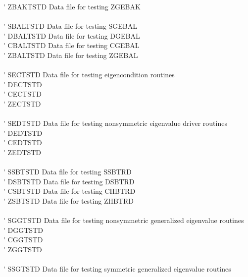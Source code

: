 \begin{tabbing}
 \> \titem \' \> ZBAKTSTD \> Data file for testing ZGEBAK \\
\vspace{0.1ex} \\
 \> \titem \' \> SBALTSTD\> Data file for testing SGEBAL \\
 \> \titem \' \> DBALTSTD \> Data file for testing DGEBAL \\
 \> \titem \' \> CBALTSTD \> Data file for testing CGEBAL \\
 \> \titem \' \> ZBALTSTD \> Data file for testing ZGEBAL \\
\vspace{0.1ex} \\
 \> \titem \' \> SECTSTD\> Data file for testing eigencondition routines \\
 \> \titem \' \> DECTSTD \> \\
 \> \titem \' \> CECTSTD \> \\
 \> \titem \' \> ZECTSTD \> \\
\vspace{0.1ex} \\
 \> \titem \' \> SEDTSTD\> Data file for testing nonsymmetric eigenvalue
driver routines \\
 \> \titem \' \> DEDTSTD \> \\
 \> \titem \' \> CEDTSTD \> \\
 \> \titem \' \> ZEDTSTD \> \\
\vspace{0.1ex} \\
 \> \titem \' \> SSBTSTD\> Data file for testing SSBTRD \\
 \> \titem \' \> DSBTSTD \> Data file for testing DSBTRD \\
 \> \titem \' \> CSBTSTD \> Data file for testing CHBTRD \\
 \> \titem \' \> ZSBTSTD \> Data file for testing ZHBTRD \\
\vspace{0.1ex} \\
 \> \titem \' \> SGGTSTD\> Data file for testing nonsymmetric generalized eigenvalue routines \\
 \> \titem \' \> DGGTSTD \> \\
 \> \titem \' \> CGGTSTD \> \\
 \> \titem \' \> ZGGTSTD \> \\
\vspace{0.1ex} \\
 \> \titem \' \> SSGTSTD\> Data file for testing symmetric generalized
eigenvalue routines \\

\end{tabbing}
